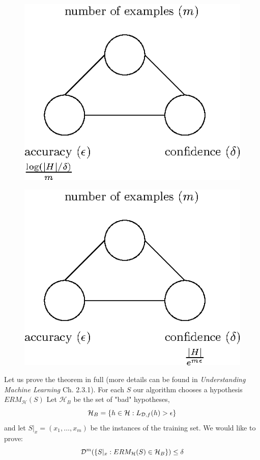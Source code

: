 \documentclass[11pt]{article}
\newcommand{\Hc}{\mathcal{H}}
\begin{document}
  \begin{figure}[h!]
 \centering\includegraphics[scale=0.8]{connection_m_eps_delta_finite2.eps}
 \end{figure}


  \begin{figure}[h!]
 \centering\includegraphics[scale=0.8]{connection_m_eps_delta_finite3.eps}
 \end{figure}

Let us prove the theorem in full (more details can be found in \textit{Understanding Machine Learning} Ch. 2.3.1). For each $S$ our algorithm chooses a hypothesis $ERM_{\Hc}(S)$
Let $\Hc_B$ be the set of "bad" hypotheses,
 \[ \Hc_B = \{h \in \Hc : L_{\D,f}(h) > \epsilon\} \]
and let $S|_x = (x_1,\ldots,x_m)$ be the instances of the training set. We would like to prove:
\[
\D^m(\{ S|_x : ERM_{\Hc}(S)\in \Hc_B \})  \le \delta
\]
\end{document}
